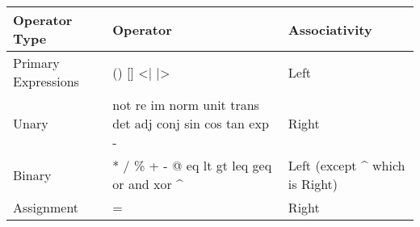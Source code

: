 \begin{flushleft}
\begin{tabular}{|l|l|l|}
	\hline    
	                   
	Operator Type & 
	Operator & 
	Associativity\\
	
	\hline
	Primary Expressions &
	\textsf{() [] <| |>} &
	Left\\
	Unary & 
	\textsf{not re im norm unit trans det adj conj sin cos tan exp -} & 
	Right\\
	Binary & 
	\textsf{* / \% + - @ eq lt gt leq geq or and xor \string^} &
	Left (except \string^ which is Right)\\
	Assignment &
	\textsf{=} 
	& Right\\
	
	\hline  
\end{tabular}
\end{flushleft}
